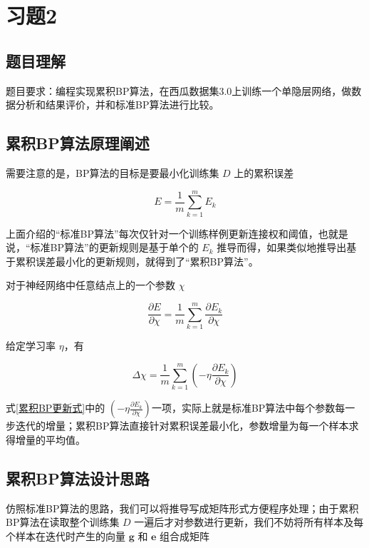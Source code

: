 \documentclass{ctexart}
\begin{document}
	\section{习题2}
	
	\subsection{题目理解}
	
	题目要求：编程实现累积BP算法，在西瓜数据集3.0上训练一个单隐层网络，做数据分析和结果评价，并和标准BP算法进行比较。
	
	\subsection{累积BP算法原理阐述}
	
	需要注意的是，BP算法的目标是要最小化训练集 $D$ 上的累积误差
	
	\begin{equation}
		E=\frac{1}{m}\sum_{k=1}^m E_k
	\end{equation}

	上面介绍的“标准BP算法”每次仅针对一个训练样例更新连接权和阈值，也就是说，“标准BP算法”的更新规则是基于单个的 $E_k$ 推导而得，如果类似地推导出基于累积误差最小化的更新规则，就得到了“累积BP算法”。
	
	对于神经网络中任意结点上的一个参数 $\chi$
	
	\begin{equation}
		\frac{\partial E}{\partial \chi}=\frac{1}{m}\sum_{k=1}^{m}\frac{\partial E_k}{\partial \chi}
	\end{equation}

	给定学习率 $\eta$，有
	
	\begin{equation}
		\Delta \chi=\frac{1}{m}\sum_{k=1}^{m}\left(-\eta\frac{\partial E_k}{\partial \chi}\right)
		\label{累积BP更新式}
	\end{equation}
	
	式\eqref{累积BP更新式}中的 $\left(-\eta\frac{\partial E_k}{\partial \chi}\right)$一项，实际上就是标准BP算法中每个参数每一步迭代的增量；累积BP算法直接针对累积误差最小化，参数增量为每一个样本求得增量的平均值。
	
	\subsection{累积BP算法设计思路}
	
	仿照标准BP算法的思路，我们可以将推导写成矩阵形式方便程序处理；由于累积BP算法在读取整个训练集 $D$ 一遍后才对参数进行更新，我们不妨将所有样本及每个样本在迭代时产生的向量 $\bm{g}$ 和 $\bm{e}$ 组合成矩阵
	
\end{document}
